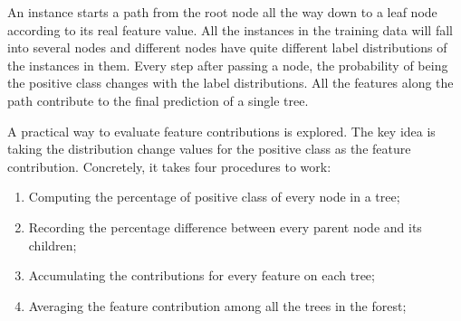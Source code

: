 An instance starts a path from the root node all the way down to a leaf node according
to its real feature value. All the instances in the training data will fall into several nodes and different nodes have quite different label distributions of the 
instances in them.  Every step after passing a node, the probability of being the positive class changes with the label distributions.
All the features along the path contribute to the final prediction of a single tree.

A practical way to evaluate feature contributions is explored\cite{palczewska2013interpreting}. The key idea is taking the distribution change values for the positive class as 
the feature contribution. Concretely, it takes four procedures to work:
\begin{enumerate}
\item Computing the percentage of positive class of every node in a tree;
\item Recording the percentage difference between every parent node and its children;
\item Accumulating the contributions for every feature on each tree;
\item Averaging the feature contribution among all the trees in the forest;
\end{enumerate}

